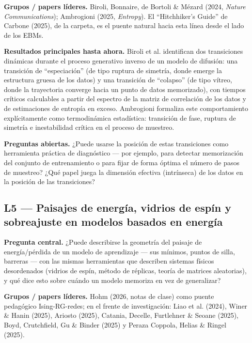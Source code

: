 \documentclass[12pt]{article}
\begin{document}
\textbf{Grupos / papers líderes.} Biroli, Bonnaire, de Bortoli \& Mézard (2024, \emph{Nature Communications}); Ambrogioni (2025, \emph{Entropy}). El ``Hitchhiker's Guide'' de Carbone (2025), de la carpeta, es el puente natural hacia esta línea desde el lado de los EBMs.

\textbf{Resultados principales hasta ahora.} Biroli et al. identifican dos transiciones dinámicas durante el proceso generativo inverso de un modelo de difusión: una transición de ``especiación'' (de tipo ruptura de simetría, donde emerge la estructura gruesa de los datos) y una transición de ``colapso'' (de tipo vítreo, donde la trayectoria converge hacia un punto de datos memorizado), con tiempos críticos calculables a partir del espectro de la matriz de correlación de los datos y de estimaciones de entropía en exceso. Ambrogioni formaliza este comportamiento explícitamente como termodinámica estadística: transición de fase, ruptura de simetría e inestabilidad crítica en el proceso de muestreo.

\textbf{Preguntas abiertas.} ¿Puede usarse la posición de estas transiciones como herramienta práctica de diagnóstico --- por ejemplo, para detectar memorización del conjunto de entrenamiento o para fijar de forma óptima el número de pasos de muestreo? ¿Qué papel juega la dimensión efectiva (intrínseca) de los datos en la posición de las transiciones?

\subsection{L5 --- Paisajes de energía, vidrios de espín y sobreajuste en modelos basados en energía}

\textbf{Pregunta central.} ¿Puede describirse la geometría del paisaje de energía/pérdida de un modelo de aprendizaje --- sus mínimos, puntos de silla, barreras --- con las mismas herramientas que describen sistemas físicos desordenados (vidrios de espín, método de réplicas, teoría de matrices aleatorias), y qué dice esto sobre cuándo un modelo memoriza en vez de generalizar?

\textbf{Grupos / papers líderes.} Hohm (2026, notas de clase) como puente pedagógico Ising-RG-redes; en el frente de investigación: Liao et al. (2024), Winer \& Hanin (2025), Ariosto (2025), Catania, Decelle, Furtlehner \& Seoane (2025), Boyd, Crutchfield, Gu \& Binder (2025) y Peraza Coppola, Helias \& Ringel (2025).
\end{document}
